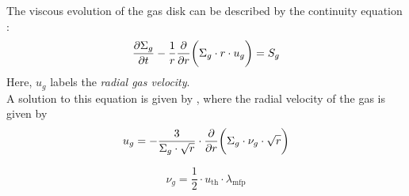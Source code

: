 
        The viscous evolution of the gas disk can be described by the continuity equation 
        \cite{birnstiel_dullemond_brauer_2010}:
        \begin{equation}
            \frac{\partial \Sigma_g}{\partial t}-\frac{1}{r}\frac{\partial }{\partial r}\bigg(\Sigma_g \cdot r \cdot u_g\bigg) = S_g
        \end{equation}
        Here, $u_g$ labels the \textit{radial gas velocity}.
        \\

        A solution to this equation is given by \cite{lynden-bell_pringle_1974}, where the 
        radial velocity of the gas is given by
        \begin{equation}
            u_{g}
            =-\frac{3}{\Sigma_g\cdot\sqrt{r}}
                \cdot\frac{\partial }{\partial r}\bigg(\Sigma_g \cdot \nu_g \cdot \sqrt{r}\bigg)
        \end{equation}

        \begin{equation}
            \nu_g = \frac{1}{2} \cdot u_\text{th} \cdot \lambda_\text{mfp}
        \end{equation}

        


